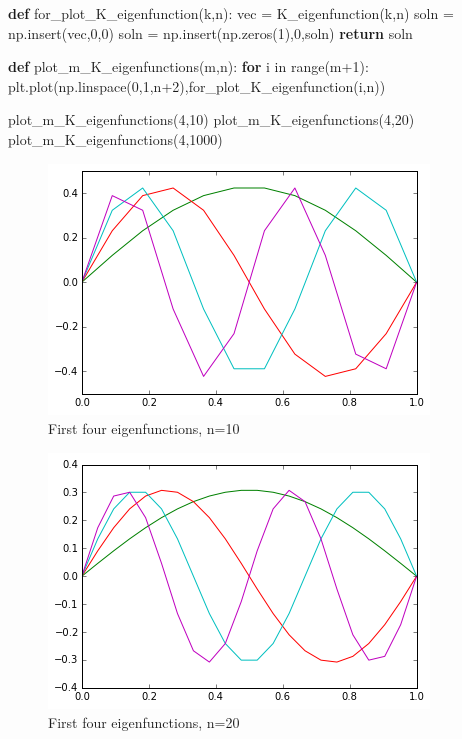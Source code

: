 \documentclass[12pt,]{book}
\newenvironment{Shaded}{}{}
\newcommand{\KeywordTok}[1]{\textcolor[rgb]{0.00,0.44,0.13}{\textbf{{#1}}}}
\newcommand{\DecValTok}[1]{\textcolor[rgb]{0.25,0.63,0.44}{{#1}}}
\newcommand{\ControlFlowTok}[1]{\textcolor[rgb]{0.00,0.44,0.13}{\textbf{{#1}}}}
\newcommand{\OperatorTok}[1]{\textcolor[rgb]{0.40,0.40,0.40}{{#1}}}
\newcommand{\BuiltInTok}[1]{{#1}}
\newcommand{\NormalTok}[1]{{#1}}
\begin{document}
\begin{Shaded}
\begin{Highlighting}[]
\KeywordTok{def} \NormalTok{for_plot_K_eigenfunction(k,n):}
  \NormalTok{vec }\OperatorTok{=} \NormalTok{K_eigenfunction(k,n)}
  \NormalTok{soln }\OperatorTok{=} \NormalTok{np.insert(vec,}\DecValTok{0}\NormalTok{,}\DecValTok{0}\NormalTok{)}
  \NormalTok{soln }\OperatorTok{=} \NormalTok{np.insert(np.zeros(}\DecValTok{1}\NormalTok{),}\DecValTok{0}\NormalTok{,soln)}
  \ControlFlowTok{return} \NormalTok{soln   }

\KeywordTok{def} \NormalTok{plot_m_K_eigenfunctions(m,n):}
  \ControlFlowTok{for} \NormalTok{i }\OperatorTok{in} \BuiltInTok{range}\NormalTok{(m}\DecValTok{+1}\NormalTok{):}
  \NormalTok{plt.plot(np.linspace(}\DecValTok{0}\NormalTok{,}\DecValTok{1}\NormalTok{,n}\DecValTok{+2}\NormalTok{),for_plot_K_eigenfunction(i,n))  }

\NormalTok{plot_m_K_eigenfunctions(}\DecValTok{4}\NormalTok{,}\DecValTok{10}\NormalTok{)}
\NormalTok{plot_m_K_eigenfunctions(}\DecValTok{4}\NormalTok{,}\DecValTok{20}\NormalTok{)}
\NormalTok{plot_m_K_eigenfunctions(}\DecValTok{4}\NormalTok{,}\DecValTok{1000}\NormalTok{)}
\end{Highlighting}
\end{Shaded}

\begin{figure}[htbp]
\centering
\includegraphics{assets/graphics/1_5_eigenvectors_23_1.png}
\caption{First four eigenfunctions, n=10}
\end{figure}

\begin{figure}[htbp]
\centering
\includegraphics{assets/graphics/1_5_eigenvectors_24_1.png}
\caption{First four eigenfunctions, n=20}
\end{figure}
\end{document}
